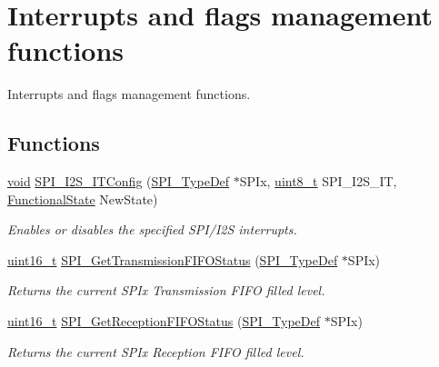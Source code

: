 \hypertarget{group___s_p_i___group5}{\section{Interrupts and flags management functions}
\label{group___s_p_i___group5}
}


Interrupts and flags management functions.  


\subsection*{Functions}
\begin{DoxyCompactItemize}
\item 
\hyperlink{group___n_a_m_e_ga18028b8badbf1ea7e704ccac3c488e82}{void} \hyperlink{group___s_p_i___group5_ga17f4ef132e8ddbf94cb6b1688d181e41}{S\-P\-I\-\_\-\-I2\-S\-\_\-\-I\-T\-Config} (\hyperlink{struct_s_p_i___type_def}{S\-P\-I\-\_\-\-Type\-Def} $\ast$S\-P\-Ix, \hyperlink{stdint_8h_aba7bc1797add20fe3efdf37ced1182c5}{uint8\-\_\-t} S\-P\-I\-\_\-\-I2\-S\-\_\-\-I\-T, \hyperlink{group___exported__types_gac9a7e9a35d2513ec15c3b537aaa4fba1}{Functional\-State} New\-State)
\begin{DoxyCompactList}\small\item\em Enables or disables the specified S\-P\-I/\-I2\-S interrupts. \end{DoxyCompactList}\item 
\hyperlink{stdint_8h_a273cf69d639a59973b6019625df33e30}{uint16\-\_\-t} \hyperlink{group___s_p_i___group5_ga8c78d4a6ba205a73dccee48c1f894a8b}{S\-P\-I\-\_\-\-Get\-Transmission\-F\-I\-F\-O\-Status} (\hyperlink{struct_s_p_i___type_def}{S\-P\-I\-\_\-\-Type\-Def} $\ast$S\-P\-Ix)
\begin{DoxyCompactList}\small\item\em Returns the current S\-P\-Ix Transmission F\-I\-F\-O filled level. \end{DoxyCompactList}\item 
\hyperlink{stdint_8h_a273cf69d639a59973b6019625df33e30}{uint16\-\_\-t} \hyperlink{group___s_p_i___group5_ga7654bccd578274bec83819e3aff04e8b}{S\-P\-I\-\_\-\-Get\-Reception\-F\-I\-F\-O\-Status} (\hyperlink{struct_s_p_i___type_def}{S\-P\-I\-\_\-\-Type\-Def} $\ast$S\-P\-Ix)
\begin{DoxyCompactList}\small\item\em Returns the current S\-P\-Ix Reception F\-I\-F\-O filled level. \end{DoxyCompactList}\item 

\end{DoxyCompactItemize}
